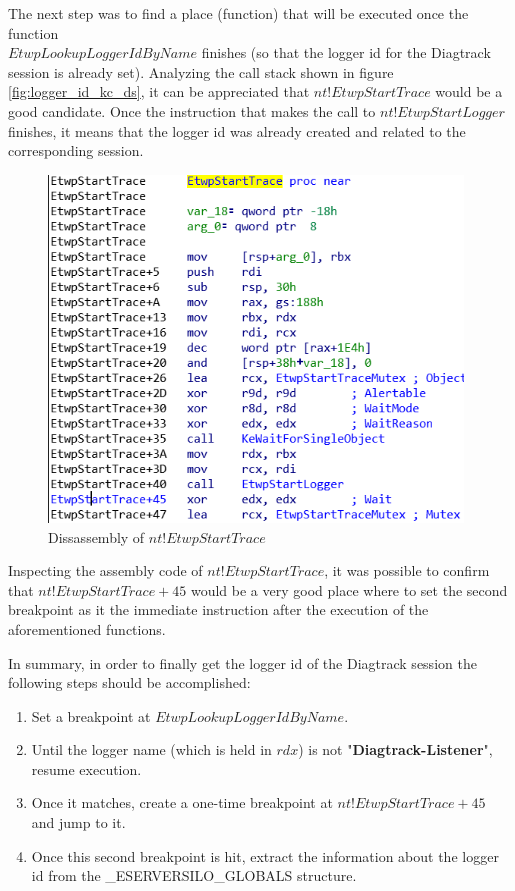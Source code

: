 The next step was to find a place (function) that will be executed once the function \\ $EtwpLookupLoggerIdByName$ finishes (so that the logger id for the Diagtrack session is already set). Analyzing the call stack shown in figure \ref{fig:logger_id_kc_ds}, it can be appreciated that $nt!EtwpStartTrace$ would be a good candidate. Once the instruction that makes the call to $nt!EtwpStartLogger$ finishes, it means that the logger id was already created and related to the corresponding session. 


\begin{figure}[H]
  \includegraphics[width=11cm]{images/automation/loggerid/EtwpStartTrace.png}
  \caption[]{Dissassembly of $nt!EtwpStartTrace$ }
  \label{fig:disas_etwstartrace}
\end{figure}

Inspecting the assembly code of $nt!EtwpStartTrace$, it was possible to confirm that $nt!EtwpStartTrace+45$ would be a very good place where to set the second breakpoint as it the immediate instruction after the execution of the aforementioned functions.


In summary, in order to finally get the logger id of the Diagtrack session the following steps should be accomplished: 

\begin{enumerate}
  \setlength\itemsep{0.05em}
  \item Set a breakpoint at $EtwpLookupLoggerIdByName$. 
  \item Until the logger name (which is held in $rdx$) is not "{\bfseries Diagtrack-Listener}", resume execution.  
  \item Once it matches, create a one-time breakpoint at $nt!EtwpStartTrace+45$ and jump to it. 
  \item Once this second breakpoint is hit, extract the information about the logger id from the \_ESERVERSILO\_GLOBALS structure.
\end{enumerate}


